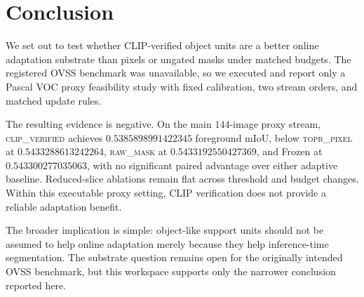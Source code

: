 \documentclass{article}
\newcommand{\method}{\textsc{clip\_verified}}
\newcommand{\topb}{\textsc{topb\_pixel}}
\newcommand{\rawmask}{\textsc{raw\_mask}}
\newcommand{\miou}{mIoU}
\begin{document}
\section{Conclusion}
\label{sec:conclusion}
We set out to test whether CLIP-verified object units are a better online adaptation substrate than pixels or ungated masks under matched budgets. The registered OVSS benchmark was unavailable, so we executed and report only a Pascal VOC proxy feasibility study with fixed calibration, two stream orders, and matched update rules.

The resulting evidence is negative. On the main $144$-image proxy stream, \method{} achieves $0.5385898991422345$ foreground \miou{}, below \topb{} at $0.5433288613242264$, \rawmask{} at $0.5433192550427369$, and Frozen at $0.543300277035063$, with no significant paired advantage over either adaptive baseline. Reduced-slice ablations remain flat across threshold and budget changes. Within this executable proxy setting, CLIP verification does not provide a reliable adaptation benefit.

The broader implication is simple: object-like support units should not be assumed to help online adaptation merely because they help inference-time segmentation. The substrate question remains open for the originally intended OVSS benchmark, but this workspace supports only the narrower conclusion reported here.
\end{document}
